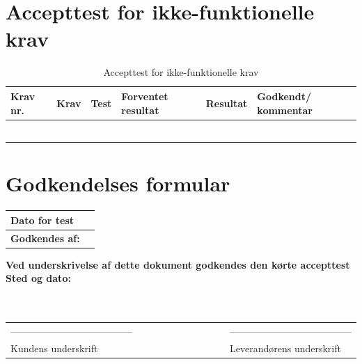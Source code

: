 \newpage
\newpage

\section{Accepttest for ikke-funktionelle krav}

\begin{longtable}{|>{\raggedright\arraybackslash}p{1.1cm}| >{\raggedright\arraybackslash}p{2.7cm} | >{\raggedright\arraybackslash}p{2.7cm} | >{\raggedright\arraybackslash}p{2.7cm} | >{\raggedright\arraybackslash}p{2.2cm} |>{\raggedright\arraybackslash}p{2.2cm}|}
   \caption{Accepttest for ikke-funktionelle krav}\label{tab:label13}
\\ \hline   
\textbf{Krav nr.}&\textbf{Krav} &\textbf{Test}& \textbf{Forventet resultat} & \textbf{Resultat} & \textbf{Godkendt/ kommentar}\\ \hline
   & & & & & \\\hline
   & & & & & \\\hline
   & & & & & \\\hline
   & & & & & \\\hline
   & & & & & \\\hline
   & & & & & \\\hline
\end{longtable}

\section{Godkendelses formular}
\begin{table}[h!]
\label{tab:tabel14}
\begin{tabular}{| l | >{\raggedright\arraybackslash}p{12cm} |}
   \hline
   \textbf{Dato for test} &\\ \hline
   \textbf{Godkendes af:} & \\ \hline
\end{tabular}
\end{table}
\textbf{Ved underskrivelse af dette dokument godkendes den kørte accepttest}
\newline
\textbf{Sted og dato:}\\
\\
\\
\begin{table}
[h!]
\begin{tabular}{ l lllllllll l}
--------------------------------------&&&&&&&&&&--------------------------------------\\ 
Kundens underskrift &&&&&&&&&&Leverandørens underskrift\\
\end{tabular}
\end{table}